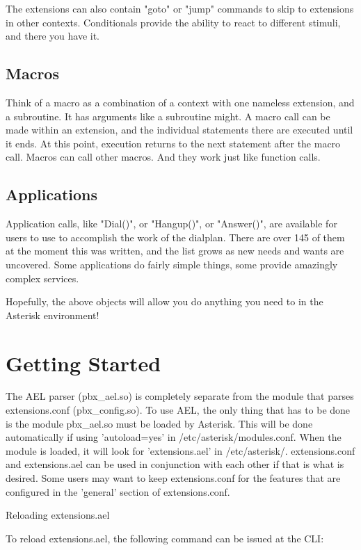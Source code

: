 The extensions can also contain "goto" or "jump" commands to skip to
extensions in other contexts. Conditionals provide the ability to
react to different stimuli, and there you have it.

\subsection{Macros}

Think of a macro as a combination of a context with one nameless
extension, and a subroutine. It has arguments like a subroutine
might. A macro call can be made within an extension, and the
individual statements there are executed until it ends. At this point,
execution returns to the next statement after the macro call. Macros
can call other macros. And they work just like function calls.

\subsection{Applications}

Application calls, like "Dial()", or "Hangup()", or "Answer()", are
available for users to use to accomplish the work of the
dialplan. There are over 145 of them at the moment this was written,
and the list grows as new needs and wants are uncovered. Some
applications do fairly simple things, some provide amazingly complex
services.

Hopefully, the above objects will allow you do anything you need to in
the Asterisk environment!

\section{Getting Started}

The AEL parser (pbx\_ael.so) is completely separate from the module
that parses extensions.conf (pbx\_config.so). To use AEL, the only
thing that has to be done is the module pbx\_ael.so must be loaded by
Asterisk. This will be done automatically if using 'autoload=yes' in
/etc/asterisk/modules.conf. When the module is loaded, it will look
for 'extensions.ael' in /etc/asterisk/. extensions.conf and
extensions.ael can be used in conjunction with
each other if that is what is desired. Some users may want to keep
extensions.conf for the features that are configured in the 'general'
section of extensions.conf.

Reloading extensions.ael

To reload extensions.ael, the following command can be issued at the
CLI:

